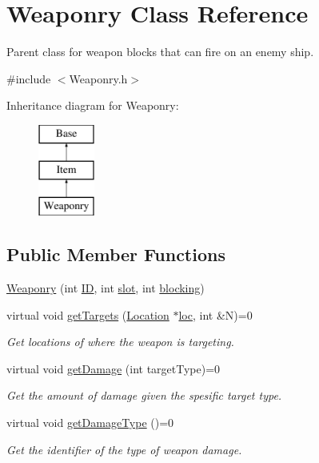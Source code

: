 \hypertarget{classWeaponry}{\section{Weaponry Class Reference}
\label{classWeaponry}
}


Parent class for weapon blocks that can fire on an enemy ship.  




{\ttfamily \#include $<$Weaponry.\-h$>$}

Inheritance diagram for Weaponry\-:\begin{figure}[H]
\begin{center}
\leavevmode
\includegraphics[height=3.000000cm]{classWeaponry}
\end{center}
\end{figure}
\subsection*{Public Member Functions}
\begin{DoxyCompactItemize}
\item 
\hyperlink{classWeaponry_a4a16e01bf2e344703c502020931e0cda}{Weaponry} (int \hyperlink{classBase_a1dddc037afe2eae3e1364597e6a3cf46}{I\-D}, int \hyperlink{classItem_adcfbfc3a87d2112c62b812dac2c72993}{slot}, int \hyperlink{classItem_a5166900b24ba9e746a7ad34c00353cdd}{blocking})
\item 
virtual void \hyperlink{classWeaponry_a25e7854098914225b10722fccbe7a3a8}{get\-Targets} (\hyperlink{structLocation}{Location} $\ast$\hyperlink{classItem_ade907eeeea58df68fcacde1e5568779b}{loc}, int \&N)=0
\begin{DoxyCompactList}\small\item\em Get locations of where the weapon is targeting. \end{DoxyCompactList}\item 
virtual void \hyperlink{classWeaponry_a65e4ba85708c33bf0a6b138e7db19e69}{get\-Damage} (int target\-Type)=0
\begin{DoxyCompactList}\small\item\em Get the amount of damage given the spesific target type. \end{DoxyCompactList}\item 
virtual void \hyperlink{classWeaponry_abf73f52293778d70c1639a7f866f0e86}{get\-Damage\-Type} ()=0
\begin{DoxyCompactList}\small\item\em Get the identifier of the type of weapon damage. \end{DoxyCompactList}\end{DoxyCompactItemize}
